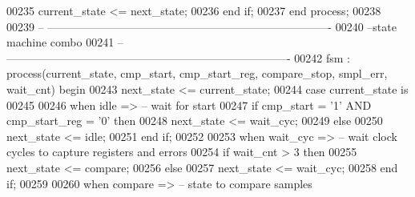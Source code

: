 \begin{DoxyCode}
00235         \textcolor{vhdlchar}{current_state} \textcolor{vhdlchar}{<=} \textcolor{vhdlchar}{next_state};
00236     \textcolor{keywordflow}{end} \textcolor{keywordflow}{if}; 
00237 \textcolor{keywordflow}{end} \textcolor{keywordflow}{process};
00238 
00239 \textcolor{keyword}{-- ----------------------------------------------------------------------------}
00240 \textcolor{keyword}{--state machine combo}
00241 \textcolor{keyword}{-- ----------------------------------------------------------------------------}
00242 fsm : \textcolor{keywordflow}{process}(current_state, cmp_start, cmp_start_reg, compare_stop, smpl_err, 
      wait_cnt) \textcolor{keywordflow}{begin}
00243     \textcolor{vhdlchar}{next_state} \textcolor{vhdlchar}{<=} \textcolor{vhdlchar}{current_state};
00244     \textcolor{keywordflow}{case} \textcolor{vhdlchar}{current_state} \textcolor{keywordflow}{is}
00245       
00246         \textcolor{keywordflow}{when} \textcolor{vhdlchar}{idle} \textcolor{vhdlchar}{=}\textcolor{vhdlchar}{>}\textcolor{keyword}{                     -- wait for start}
00247          \textcolor{keywordflow}{if} \textcolor{vhdlchar}{cmp_start} \textcolor{vhdlchar}{=} \textcolor{vhdlchar}{'}\textcolor{vhdllogic}{}\textcolor{vhdllogic}{1}\textcolor{vhdlchar}{'} \textcolor{keywordflow}{AND} \textcolor{vhdlchar}{cmp_start_reg} \textcolor{vhdlchar}{=} \textcolor{vhdlchar}{'}\textcolor{vhdllogic}{}\textcolor{vhdllogic}{0}\textcolor{vhdlchar}{'} \textcolor{keywordflow}{then} 
00248             \textcolor{vhdlchar}{next_state} \textcolor{vhdlchar}{<=} \textcolor{vhdlchar}{wait\_cyc};
00249          \textcolor{keywordflow}{else}
00250             \textcolor{vhdlchar}{next_state} \textcolor{vhdlchar}{<=} \textcolor{vhdlchar}{idle};
00251          \textcolor{keywordflow}{end} \textcolor{keywordflow}{if};
00252          
00253       \textcolor{keywordflow}{when} \textcolor{vhdlchar}{wait\_cyc} \textcolor{vhdlchar}{=}\textcolor{vhdlchar}{>}\textcolor{keyword}{                 -- wait clock cycles to capture registers and errors}
00254          \textcolor{keywordflow}{if} \textcolor{vhdlchar}{wait_cnt} \textcolor{vhdlchar}{>} \textcolor{vhdllogic}{}\textcolor{vhdllogic}{3} \textcolor{keywordflow}{then} 
00255             \textcolor{vhdlchar}{next_state} \textcolor{vhdlchar}{<=} \textcolor{vhdlchar}{compare};
00256          \textcolor{keywordflow}{else} 
00257             \textcolor{vhdlchar}{next_state} \textcolor{vhdlchar}{<=} \textcolor{vhdlchar}{wait\_cyc};
00258          \textcolor{keywordflow}{end} \textcolor{keywordflow}{if};
00259                 
00260       \textcolor{keywordflow}{when} \textcolor{vhdlchar}{compare} \textcolor{vhdlchar}{=}\textcolor{vhdlchar}{>}\textcolor{keyword}{                  -- state to compare samples}

\end{DoxyCode}
